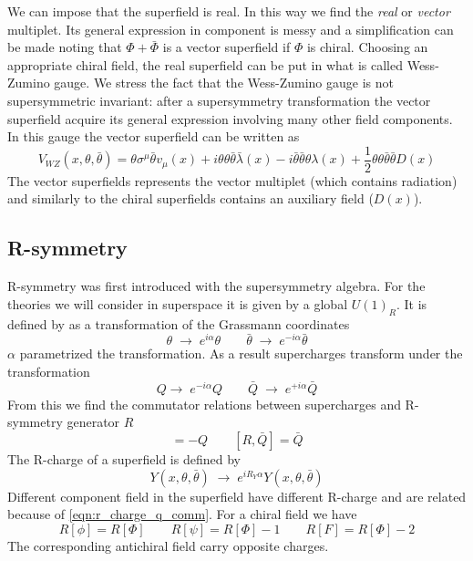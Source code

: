 \begin{appendices}
We can impose that the superfield is real. In this way we find the 
\emph{real} or \emph{vector} multiplet.
Its general expression in component is messy and a simplification can be made noting that $\Phi + \bar{\Phi}$ is a vector superfield if $\Phi$ is chiral.
Choosing an appropriate chiral field, the real superfield can be put in what is called Wess-Zumino gauge. 
We stress the fact that the Wess-Zumino gauge is not supersymmetric invariant: after a supersymmetry transformation the vector superfield acquire its general expression involving many other field components.
In this gauge the vector superfield can be written as 
\begin{equation}
 V_{WZ} (x, \theta,\bar{\theta}) = \theta \sigma^{\mu} \bar{\theta} v_{\mu} (x) + i \theta\theta \bar{\theta} \bar{\lambda} (x) - i \bar{\theta} \bar{\theta} \theta \lambda(x) + \frac{1}{2} \theta \theta \bar{\theta} \bar{\theta} D(x)
\end{equation}
The vector superfields represents the vector multiplet (which contains radiation) and similarly to the chiral superfields contains an auxiliary field ($D(x)$).
  
\subsection{R-symmetry}
R-symmetry was first introduced with the supersymmetry algebra.
For the theories we will consider in superspace it is given by a global $U(1)_R$.
It is defined by as a transformation of the Grassmann coordinates
\begin{equation}
\theta \; \rightarrow \; e^{i \alpha} \theta \qquad \bar{\theta} \; \rightarrow \; e^{-i \alpha} \bar{\theta}
\end{equation}
$\alpha$ parametrized the transformation.
As a result supercharges transform under the transformation 
\begin{equation}
 Q \rightarrow \; e^{-i \alpha} Q  \qquad \bar{Q} \; \rightarrow \; e^{+i \alpha} \bar{Q}
\end{equation}
From this we find the commutator relations between supercharges and R-symmetry generator $R$
\begin{equation}
[R,Q] = - Q \qquad [R,\bar{Q}] = \bar{Q}
\label{eqn:r_charge_q_comm}
\end{equation}
The R-charge of a superfield is defined by
\begin{equation}
 Y (x, \theta ,\bar{\theta} ) \; \rightarrow \; e^{i R_Y \alpha} Y (x, \theta ,\bar{\theta} ) 
\end{equation}
Different component field in the superfield have different R-charge and are related because of \ref{eqn:r_charge_q_comm}.
For a chiral field we have
\begin{equation}
R[\phi] = R\left [{\Phi}\right] \qquad R[\psi] = R\left [{\Phi}\right] - 1 \qquad R[F] =  R\left [{\Phi}\right] - 2 
\end{equation}
The corresponding antichiral field carry opposite charges.



\end{appendices}

